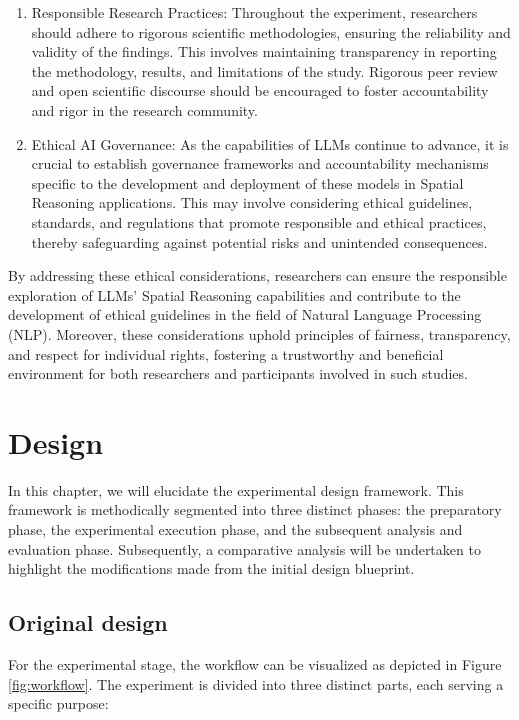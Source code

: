 \documentclass[twocolumn,11pt]{report}
\begin{document}
\begin{enumerate}
    \item Responsible Research Practices: Throughout the experiment, researchers should adhere to rigorous scientific methodologies, ensuring the reliability and validity of the findings. This involves maintaining transparency in reporting the methodology, results, and limitations of the study. Rigorous peer review and open scientific discourse should be encouraged to foster accountability and rigor in the research community.
    \item Ethical AI Governance: As the capabilities of LLMs continue to advance, it is crucial to establish governance frameworks and accountability mechanisms specific to the development and deployment of these models in Spatial Reasoning applications. This may involve considering ethical guidelines, standards, and regulations that promote responsible and ethical practices, thereby safeguarding against potential risks and unintended consequences.
\end{enumerate}
By addressing these ethical considerations, researchers can ensure the responsible exploration of LLMs' Spatial Reasoning capabilities and contribute to the development of ethical guidelines in the field of Natural Language Processing (NLP). Moreover, these considerations uphold principles of fairness, transparency, and respect for individual rights, fostering a trustworthy and beneficial environment for both researchers and participants involved in such studies.


\chapter{Design}\label{chap:design}

In this chapter, we will elucidate the experimental design framework. This framework is methodically segmented into three distinct phases: the preparatory phase, the experimental execution phase, and the subsequent analysis and evaluation phase. Subsequently, a comparative analysis will be undertaken to highlight the modifications made from the initial design blueprint.

\section{Original design}\label{chap:first_design}
For the experimental stage, the workflow can be visualized as depicted in Figure \ref{fig:workflow}. The experiment is divided into three distinct parts, each serving a specific purpose:
\end{document}
